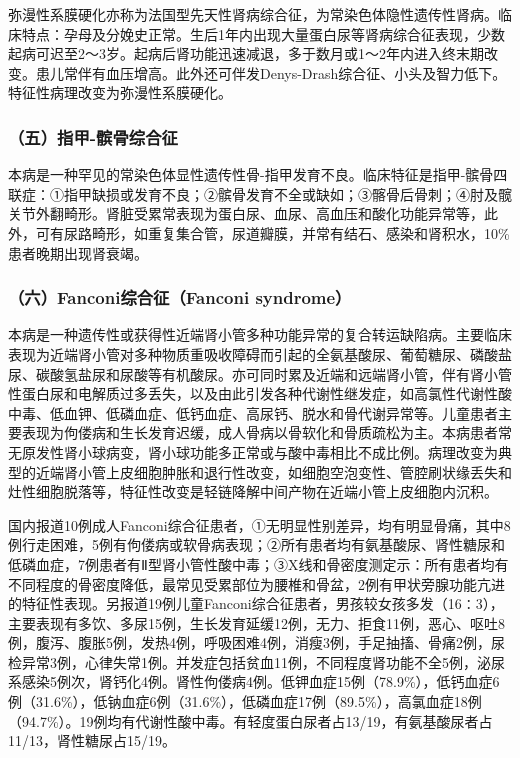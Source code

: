 弥漫性系膜硬化亦称为法国型先天性肾病综合征，为常染色体隐性遗传性肾病。临床特点：孕母及分娩史正常。生后1年内出现大量蛋白尿等肾病综合征表现，少数起病可迟至2～3岁。起病后肾功能迅速减退，多于数月或1～2年内进入终末期改变。患儿常伴有血压增高。此外还可伴发Denys-Drash综合征、小头及智力低下。特征性病理改变为弥漫性系膜硬化。

\subsubsection{（五）指甲-髌骨综合征}

本病是一种罕见的常染色体显性遗传性骨-指甲发育不良。临床特征是指甲-髌骨四联症：①指甲缺损或发育不良；②髌骨发育不全或缺如；③髂骨后骨刺；④肘及髋关节外翻畸形。肾脏受累常表现为蛋白尿、血尿、高血压和酸化功能异常等，此外，可有尿路畸形，如重复集合管，尿道瓣膜，并常有结石、感染和肾积水，10\%患者晚期出现肾衰竭。

\subsubsection{（六）Fanconi综合征（Fanconi syndrome）}

本病是一种遗传性或获得性近端肾小管多种功能异常的复合转运缺陷病。主要临床表现为近端肾小管对多种物质重吸收障碍而引起的全氨基酸尿、葡萄糖尿、磷酸盐尿、碳酸氢盐尿和尿酸等有机酸尿。亦可同时累及近端和远端肾小管，伴有肾小管性蛋白尿和电解质过多丢失，以及由此引发各种代谢性继发症，如高氯性代谢性酸中毒、低血钾、低磷血症、低钙血症、高尿钙、脱水和骨代谢异常等。儿童患者主要表现为佝偻病和生长发育迟缓，成人骨病以骨软化和骨质疏松为主。本病患者常无原发性肾小球病变，肾小球功能多正常或与酸中毒相比不成比例。病理改变为典型的近端肾小管上皮细胞肿胀和退行性改变，如细胞空泡变性、管腔刷状缘丢失和灶性细胞脱落等，特征性改变是轻链降解中间产物在近端小管上皮细胞内沉积。

国内报道10例成人Fanconi综合征患者，①无明显性别差异，均有明显骨痛，其中8例行走困难，5例有佝偻病或软骨病表现；②所有患者均有氨基酸尿、肾性糖尿和低磷血症，7例患者有Ⅱ型肾小管性酸中毒；③X线和骨密度测定示：所有患者均有不同程度的骨密度降低，最常见受累部位为腰椎和骨盆，2例有甲状旁腺功能亢进的特征性表现。另报道19例儿童Fanconi综合征患者，男孩较女孩多发（16∶3），主要表现有多饮、多尿15例，生长发育延缓12例，无力、拒食11例，恶心、呕吐8例，腹泻、腹胀5例，发热4例，呼吸困难4例，消瘦3例，手足抽搐、骨痛2例，尿检异常3例，心律失常1例。并发症包括贫血11例，不同程度肾功能不全5例，泌尿系感染5例次，肾钙化4例。肾性佝偻病4例。低钾血症15例（78.9\%），低钙血症6例（31.6\%），低钠血症6例（31.6\%），低磷血症17例（89.5\%），高氯血症18例（94.7\%）。19例均有代谢性酸中毒。有轻度蛋白尿者占13/19，有氨基酸尿者占11/13，肾性糖尿占15/19。

